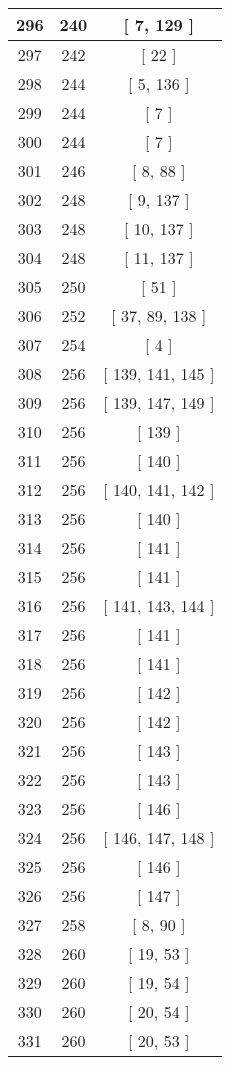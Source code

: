 \begin{center}
\begin{longtable}[H]{|| c c c ||}
\\\hline
296 & 240 & [ 7, 129 ]
\\\hline
297 & 242 & [ 22 ]
\\\hline
298 & 244 & [ 5, 136 ]
\\\hline
299 & 244 & [ 7 ]
\\\hline
300 & 244 & [ 7 ]
\\\hline
301 & 246 & [ 8, 88 ]
\\\hline
302 & 248 & [ 9, 137 ]
\\\hline
303 & 248 & [ 10, 137 ]
\\\hline
304 & 248 & [ 11, 137 ]
\\\hline
305 & 250 & [ 51 ]
\\\hline
306 & 252 & [ 37, 89, 138 ]
\\\hline
307 & 254 & [ 4 ]
\\\hline
308 & 256 & [ 139, 141, 145 ]
\\\hline
309 & 256 & [ 139, 147, 149 ]
\\\hline
310 & 256 & [ 139 ]
\\\hline
311 & 256 & [ 140 ]
\\\hline
312 & 256 & [ 140, 141, 142 ]
\\\hline
313 & 256 & [ 140 ]
\\\hline
314 & 256 & [ 141 ]
\\\hline
315 & 256 & [ 141 ]
\\\hline
316 & 256 & [ 141, 143, 144 ]
\\\hline
317 & 256 & [ 141 ]
\\\hline
318 & 256 & [ 141 ]
\\\hline
319 & 256 & [ 142 ]
\\\hline
320 & 256 & [ 142 ]
\\\hline
321 & 256 & [ 143 ]
\\\hline
322 & 256 & [ 143 ]
\\\hline
323 & 256 & [ 146 ]
\\\hline
324 & 256 & [ 146, 147, 148 ]
\\\hline
325 & 256 & [ 146 ]
\\\hline
326 & 256 & [ 147 ]
\\\hline
327 & 258 & [ 8, 90 ]
\\\hline
328 & 260 & [ 19, 53 ]
\\\hline
329 & 260 & [ 19, 54 ]
\\\hline
330 & 260 & [ 20, 54 ]
\\\hline
331 & 260 & [ 20, 53 ]
\\\hline

\end{longtable}
\end{center}
